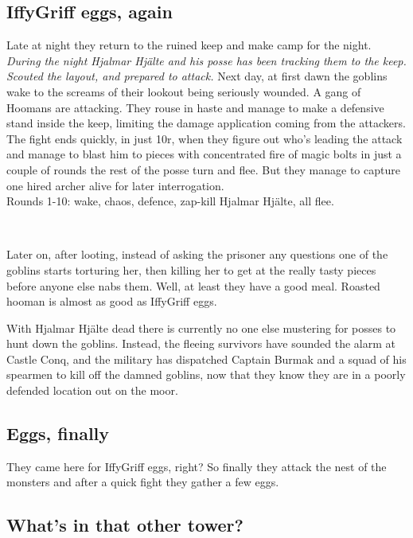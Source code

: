 \subsection*{IffyGriff eggs, again}

Late at night they return to the ruined keep and make camp for the night.
\emph{During the night Hjalmar Hjälte and his posse has been tracking them to the keep. Scouted the layout, and prepared to attack.}
Next day, at first dawn the goblins wake to the screams of their lookout being seriously wounded. A gang of Hoomans are attacking. They rouse in haste and manage to make a defensive stand inside the keep, limiting the damage application coming from the attackers. The fight ends quickly, in just 10r, when they figure out who's leading the attack and manage to blast him to pieces with concentrated fire of magic bolts in just a couple of rounds the rest of the posse turn and flee. But they manage to capture one hired archer alive for later interrogation.\\
Rounds 1-10: wake, chaos, defence, zap-kill Hjalmar Hjälte, all flee.

\

Later on, after looting, instead of asking the prisoner any questions one of the goblins starts torturing her, then killing her to get at the really tasty pieces before anyone else nabs them. Well, at least they have a good meal. Roasted hooman is almost as good as IffyGriff eggs.

\begin{readoutloud}
With Hjalmar Hjälte dead there is currently no one else mustering for posses to hunt down the goblins. Instead, the fleeing survivors have sounded the alarm at Castle Conq, and the military has dispatched Captain Burmak and a squad of his spearmen to kill off the damned goblins, now that they know they are in a poorly defended location out on the moor.
\end{readoutloud}


\subsection*{Eggs, finally}

They came here for IffyGriff eggs, right? So finally they attack the nest of the monsters and after a quick fight they gather a few eggs.


\subsection*{What's in that other tower?}

